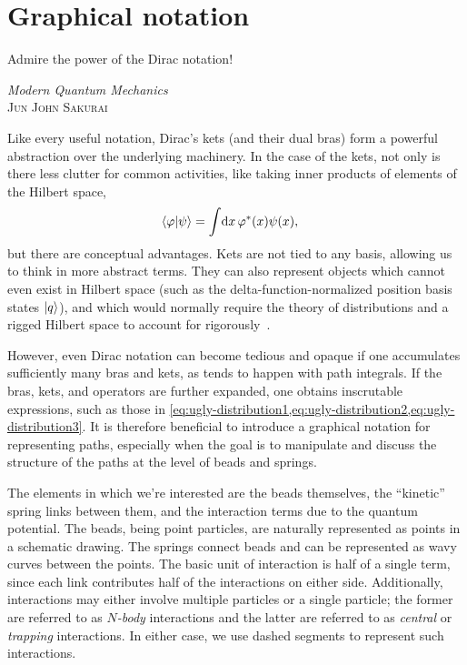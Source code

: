 \section{Graphical notation}

\label{sec:graphical}

\epigraph{
Admire the power of the Dirac notation!
}{
\textit{Modern Quantum Mechanics} \\
\textsc{Jun John Sakurai}
}

Like every useful notation, Dirac's kets (and their dual bras) form a powerful abstraction over the underlying machinery.
In the case of the kets, not only is there less clutter for common activities, like taking inner products of elements of the Hilbert space,
\begin{align}
	\braket{\phi | \psi}
	&= \int\! \dif x \, \phi\conj(x) \psi(x),
\end{align}
but there are conceptual advantages.
Kets are not tied to any basis, allowing us to think in more abstract terms.
They can also represent objects which cannot even exist in Hilbert space (such as the delta-function-normalized position basis states $\ket{q}$), and which would normally require the theory of distributions and a rigged Hilbert space to account for rigorously~\cite{de2005role}.

However, even Dirac notation can become tedious and opaque if one accumulates sufficiently many bras and kets, as tends to happen with path integrals.
If the bras, kets, and operators are further expanded, one obtains inscrutable expressions, such as those in \cref{eq:ugly-distribution1,eq:ugly-distribution2,eq:ugly-distribution3}.
It is therefore beneficial to introduce a graphical notation for representing paths, especially when the goal is to manipulate and discuss the structure of the paths at the level of beads and springs.

The elements in which we're interested are the beads themselves, the ``kinetic'' spring links between them, and the interaction terms due to the quantum potential.
The beads, being point particles, are naturally represented as points in a schematic drawing.
The springs connect beads and can be represented as wavy curves between the points.
The basic unit of interaction is half of a single term, since each link contributes half of the interactions on either side.
Additionally, interactions may either involve multiple particles or a single particle; the former are referred to as \emph{$N$-body} interactions and the latter are referred to as \emph{central} or \emph{trapping} interactions.
In either case, we use dashed segments to represent such interactions.

